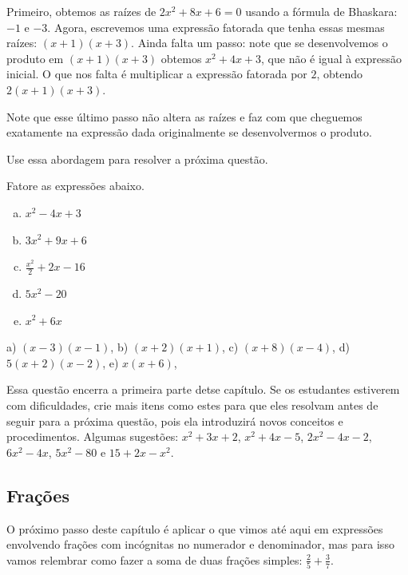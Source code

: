 \documentclass[main.tex]{subfiles}
\begin{document}
Primeiro, obtemos as raízes de $2x^2+8x+6=0$ usando a fórmula de Bhaskara: $-1$ e $-3$. Agora, escrevemos uma expressão fatorada que tenha essas mesmas raízes: $(x+1)(x+3)$. Ainda falta um passo: note que se desenvolvemos o produto em $(x+1)(x+3)$ obtemos $x^2+4x+3$, que não é igual à expressão inicial. O que nos falta é multiplicar a expressão fatorada por $2$, obtendo $2(x+1)(x+3)$.

Note que esse último passo não altera as raízes e faz com que cheguemos exatamente na expressão dada originalmente se desenvolvermos o produto.

Use essa abordagem para resolver a próxima questão.

\begin{questao}
Fatore as expressões abaixo.
\begin{enumerate}[a)]
\item $x^2-4x+3$
\item $3x^2+9x+6$
\item $\frac{x^2}{2}+2x-16$
\item $5x^2-20$
\item $x^2+6x$
\end{enumerate}
\end{questao}

\begin{gabarito}
	\begin{gabaritoQuestao}
		a) $(x-3)(x-1)$, b) $(x+2)(x+1)$, c) $(x+8)(x-4)$, d) $5(x+2)(x-2)$, e) $x(x+6)$,
	\end{gabaritoQuestao}
\end{gabarito}

\paraTutores

Essa questão encerra a primeira parte detse capítulo. Se os estudantes estiverem com dificuldades, crie mais itens como estes para que eles resolvam antes de seguir para a próxima questão, pois ela introduzirá novos conceitos e procedimentos. Algumas sugestões: $x^2+3x+2$, $x^2+4x-5$, $2x^2-4x-2$, $6x^2-4x$, $5x^2-80$ e $15+2x-x^2$.

\paraAmbos

\subsection*{Frações}

O próximo passo deste capítulo é aplicar o que vimos até aqui em expressões envolvendo frações com incógnitas no numerador e denominador, mas para isso vamos relembrar como fazer a soma de duas frações simples: $\frac{2}{5}+\frac{3}{7}$.
\end{document}
